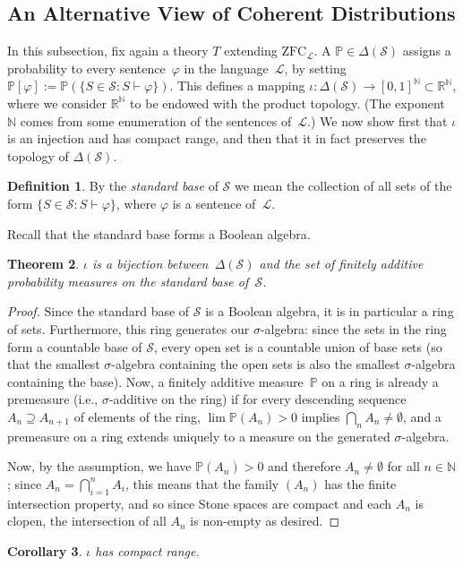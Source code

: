\documentclass[12pt]{article}
\newcommand{\PP}{\mathbb{P}}
\newcommand{\RR}{\mathbb{R}}
\newcommand{\NN}{\mathbb{N}}
\newcommand{\zfc}{\mathrm{ZFC}}
\newcommand{\zfcl}{{\zfc_\cL}}
\newcommand{\cL}{\mathcal{L}}
\newcommand{\cS}{\mathcal{S}}
\theoremstyle{plain}
\newtheorem{theorem}{Theorem}[subsection]
\newtheorem{corollary}[theorem]{Corollary}
\theoremstyle{definition}
\newtheorem{definition}[theorem]{Definition}
\theoremstyle{remark}
\begin{document}
\subsection{An Alternative View of Coherent Distributions}
In this subsection, fix again a theory $T$ extending $\zfcl$.
A $\PP\in\Delta(\cS)$ assigns a probability to every sentence~$\varphi$ in the language~$\cL$, by setting $\PP[\varphi] := \PP(\{S\in\cS:S\vdash\varphi\})$. This defines a mapping $\iota : \Delta(\cS)\to [0,1]^\NN\subset\RR^\NN$, where we consider $\RR^\NN$ to be endowed with the product topology. (The exponent~$\NN$ comes from some enumeration of the sentences of~$\cL$.) We now show first that $\iota$ is an injection and has compact range, and then that it in fact preserves the topology of $\Delta(\cS)$.
\begin{definition}
By the \emph{standard base} of $\cS$ we mean the collection of all sets of the form $\{S\in\cS : S\vdash\varphi\}$, where $\varphi$ is a sentence of~$\cL$.
\end{definition}
Recall that the standard base forms a Boolean algebra.
\begin{theorem}
$\iota$ is a bijection between~$\Delta(\cS)$ and the set of finitely additive probability measures on the standard base of~$\cS$.
\end{theorem}
\begin{proof}
Since the standard base of $\cS$ is a Boolean algebra, it is in particular a ring of sets. Furthermore, this ring generates our $\sigma$-algebra: since the sets in the ring form a countable base of $\cS$, every open set is a countable union of base sets (so that the smallest $\sigma$-algebra containing the open sets is also the smallest $\sigma$-algebra containing the base).
Now, a finitely additive measure~$\PP$ on a ring is already a premeasure (i.e., $\sigma$-additive on the ring) if for every descending sequence $A_n\supseteq A_{n+1}$ of elements of the ring, $\lim \PP(A_n) > 0$ implies $\textstyle\bigcap_n A_n \neq\emptyset$, and a premeasure on a ring extends uniquely to a measure on the generated $\sigma$-algebra. 

Now, by the assumption, we have $\PP(A_n) > 0$ and therefore $A_n\neq\emptyset$ for all $n\in\mathbb{N}$; since $\textstyle A_n = \bigcap_{i=1}^n A_i$, this means that the family $(A_n)$ has the finite intersection property, and so since Stone spaces are compact and each $A_n$ is clopen, the intersection of all $A_n$ is non-empty as desired.
\end{proof}
\begin{corollary}
$\iota$ has compact range.
\end{corollary}
\end{document}
